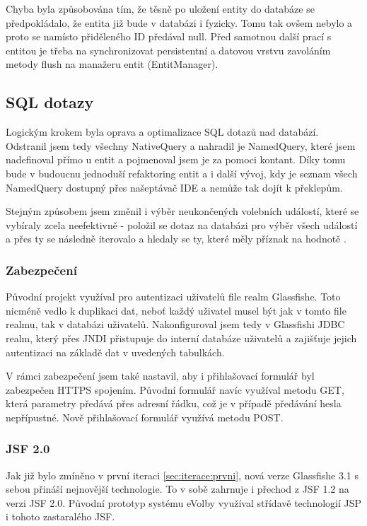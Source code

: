 \documentclass[11pt,twoside,a4paper]{book}
\begin{document}
Chyba byla způsobována tím, že těsně po uložení entity do databáze se předpokládalo, že entita již bude v databázi i fyzicky. Tomu tak ovšem nebylo a proto se namísto přiděleného ID předával null. Před samotnou další prací s entitou je třeba na synchronizovat persistentní a datovou vrstvu zavoláním metody flush na manažeru entit (EntitManager).

\subsection{SQL dotazy}

Logickým krokem byla oprava a optimalizace SQL dotazů nad databází. Odstranil jsem tedy všechny NativeQuery a nahradil je NamedQuery, které jsem nadefinoval přímo u entit a pojmenoval jsem je za pomoci kontant. Díky tomu bude v budoucnu jednoduší refaktoring entit a i další vývoj, kdy je seznam všech NamedQuery dostupný přes našeptávač IDE a nemůže tak dojít k překlepům.

Stejným způsobem jsem změnil i výběr neukončených volebních událostí, které se vybíraly zcela neefektivně - položil se dotaz na databázi pro výběr všech událostí a přes ty se následně iterovalo a hledaly se ty, které měly příznak  na hodnotě .

\subsubsection{Zabezpečení}

Původní projekt využíval pro autentizaci uživatelů file realm Glassfishe. Toto nicméně vedlo k duplikaci dat, neboť každý uživatel musel být jak v tomto file realmu, tak v databázi uživatelů. Nakonfiguroval jsem tedy v Glassfishi JDBC realm, který přes JNDI přistupuje do interní databáze uživatelů a zajišťuje jejich autentizaci na základě dat v uvedených tabulkách.

V rámci zabezpečení jsem také nastavil, aby i přihlašovací formulář byl zabezpečen HTTPS spojením. Původní formulář navíc využíval metodu GET, která parametry předává přes adresní řádku, což je v případě předávání hesla nepřípustné. Nově přihlašovací formulář využívá metodu POST.

\subsubsection{JSF 2.0}

Jak již bylo zmíněno v první iteraci \ref{sec:iterace:prvni}, nová verze Glassfishe 3.1 s sebou přináší nejnovější technologie. To v sobě zahrnuje i přechod z JSF 1.2 na verzi JSF 2.0. Původní prototyp systému eVolby\cite{www:prototyp} využíval střídavě technologií JSP i tohoto zastaralého JSF.
\end{document}
